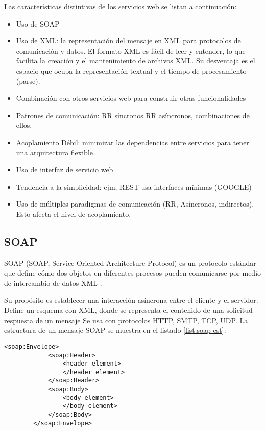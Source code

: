 Las características distintivas de los servicios web se listan a continuaci\'on:
 		\begin{itemize}
 			\item Uso de SOAP 
 			\item Uso de XML: la representación del mensaje en  XML para protocolos de comunicaci\'on y datos.   El formato XML es fácil de leer y entender, lo que facilita la creación y el mantenimiento de archivos XML. Su desventaja es el espacio que ocupa la representación textual y el tiempo de procesamiento (parse).   
 			\item Combinación con otros servicios web para construir otras funcionalidades 
 			\item Patrones de comunicación: RR síncronos  RR asíncronos, combinaciones de ellos.  		   		
 	
 			\item Acoplamiento Débil: minimizar las dependencias entre servicios para tener una arquitectura flexible 			
 			\item Uso de \gls{interfaz de servicio web} 		
 			\item Tendencia a la simplicidad: ejm, REST usa interfaces mínimas (GOOGLE) 			
 			\item	Uso de múltiples paradigmas de comunicación (RR, Asíncronos, indirectos). Esto afecta el nivel de acoplamiento.    		
 	 	\end{itemize}
 		
 	
 	  \subsection{SOAP}
 	  
 	   SOAP (SOAP, Service Oriented Architecture Protocol) es un protocolo estándar que define cómo dos objetos en diferentes procesos pueden comunicarse por medio de intercambio de datos XML .
 	    		
 	  Su propósito es establecer una interacción asíncrona entre el cliente y el servidor.  Define un esquema con XML, donde se representa el contenido de una solicitud – respuesta de un mensaje
 	  Se usa con protocolos HTTP, SMTP, TCP, UDP.
 	  La estructura de un mensaje SOAP se muestra en el listado \ref{list:soap-est}:
 	  
  
 	  \begin{lstlisting}[label=list:soap-est,caption=Estructura de mensaje SOAP]
 	 	<soap:Envelope>
 		 	<soap:Header>
 	 			<header element>
				</header element>
 	 		</soap:Header>
 	 		<soap:Body>
 	 			<body element>
 	 			</body element>
  	 		</soap:Body>
 	 	</soap:Envelope>
 	 \end{lstlisting} 
 	 
